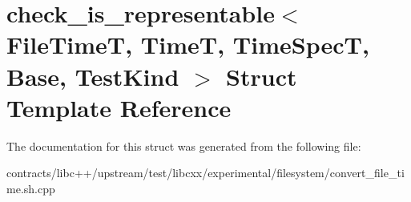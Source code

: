 \hypertarget{structcheck__is__representable}{}\section{check\+\_\+is\+\_\+representable$<$ File\+TimeT, TimeT, Time\+SpecT, Base, Test\+Kind $>$ Struct Template Reference}
\label{structcheck__is__representable}


The documentation for this struct was generated from the following file\+:\begin{DoxyCompactItemize}
\item 
contracts/libc++/upstream/test/libcxx/experimental/filesystem/convert\+\_\+file\+\_\+time.\+sh.\+cpp\end{DoxyCompactItemize}
